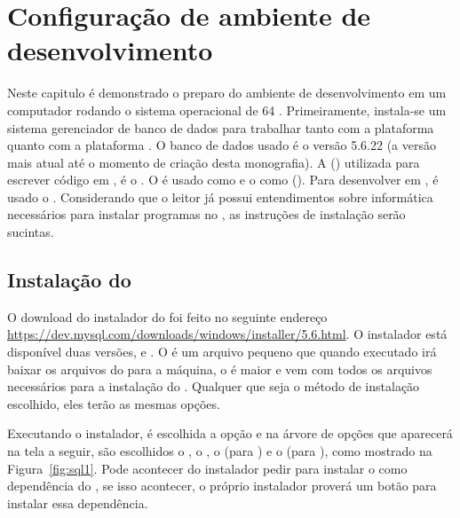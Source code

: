 \chapter{Configuração de ambiente de desenvolvimento}

Neste capitulo é demonstrado o preparo do ambiente de desenvolvimento em um computador rodando o sistema operacional  de 64 . Primeiramente, instala-se um sistema gerenciador de banco de dados para trabalhar tanto com a plataforma \spring quanto com a plataforma \anmvc.  O banco de dados usado é o  versão 5.6.22 (a versão mais atual até o momento de criação desta monografia). A  () utilizada  para escrever código em , é o . O  é usado como  e o  como   (). Para desenvolver em , é usado o . Considerando que o leitor já possui entendimentos sobre informática necessários para instalar programas no , as instruções de instalação serão sucintas. 

\section{Instalação do }

O download do instalador do  foi feito no seguinte endereço \url{https://dev.mysql.com/downloads/windows/installer/5.6.html}. O instalador está disponível duas versões,  e . O  é um arquivo pequeno que quando executado irá baixar os arquivos do  para a máquina, o  é maior e vem com todos os arquivos necessários para a  instalação do . Qualquer que seja o método de instalação escolhido, eles terão as mesmas opções.

Executando o instalador, é escolhida a opção  e na árvore de opções que aparecerá na tela a seguir, são escolhidos o , o , o  (para ) e o  (para ), como mostrado na Figura~\ref{fig:sql1}. Pode acontecer do instalador pedir para instalar o  como dependência do , se isso acontecer, o próprio instalador proverá um botão para instalar essa dependência.

